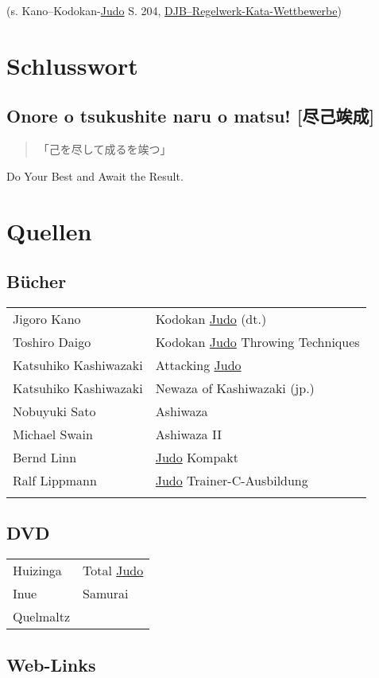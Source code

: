 \documentclass[justified, a4paper, notitlepage, captions=tableheading, nobib]{tufte-handout}
\begin{document}
(s. Kano--Kodokan-\hyperref[org80c3996]{Judo} S. 204, \href{https://www.judobund.de/fileadmin/\_horusdam/897-DJB-Regelwerk\_Kata-Wettbewerbe-IJF2015.pdf}{DJB--Regelwerk-Kata-Wettbewerbe})

\newpage

\section{Schlusswort}
\label{sec:org50c25cd}
\subsection{Onore o tsukushite naru o matsu! [尽己竢成]}
\label{sec:org4a5a8ba}
\begin{quote}
「己を尽して成るを竢つ」
\end{quote}

Do Your Best and Await the Result.

\section{Quellen }
\label{sec:orgd9be3ab}

\subsection{Bücher}
\label{sec:org10eb4fc}

\begin{center}
\begin{tabular}{ll}
Jigoro Kano & Kodokan \hyperref[org80c3996]{Judo} (dt.)\\
Toshiro Daigo & Kodokan \hyperref[org80c3996]{Judo} Throwing Techniques\\
Katsuhiko Kashiwazaki & Attacking \hyperref[org80c3996]{Judo}\\
Katsuhiko Kashiwazaki & Newaza of Kashiwazaki (jp.)\\
Nobuyuki Sato & Ashiwaza\\
Michael Swain & Ashiwaza II\\
Bernd Linn & \hyperref[org80c3996]{Judo} Kompakt\\
Ralf Lippmann & \hyperref[org80c3996]{Judo} Trainer-C-Ausbildung\\
 & \\
\end{tabular}
\end{center}

\subsection{DVD}
\label{sec:orgc2ab9c7}

\begin{center}
\begin{tabular}{ll}
Huizinga & Total \hyperref[org80c3996]{Judo}\\
Inue & Samurai\\
Quelmaltz & \\
\end{tabular}
\end{center}

\subsection{Web-Links}
\label{sec:org6a6cd03}
\end{document}
